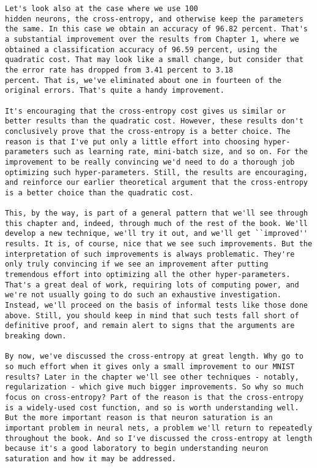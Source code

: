 \begin{lstlisting}
Let's look also at the case where we use 100
hidden neurons, the cross-entropy, and otherwise keep the parameters the same. In this case we obtain an accuracy of 96.82 percent. That's a substantial improvement over the results from Chapter 1, where we obtained a classification accuracy of 96.59 percent, using the quadratic cost. That may look like a small change, but consider that the error rate has dropped from 3.41 percent to 3.18
percent. That is, we've eliminated about one in fourteen of the original errors. That's quite a handy improvement.

It's encouraging that the cross-entropy cost gives us similar or better results than the quadratic cost. However, these results don't conclusively prove that the cross-entropy is a better choice. The reason is that I've put only a little effort into choosing hyper-parameters such as learning rate, mini-batch size, and so on. For the improvement to be really convincing we'd need to do a thorough job optimizing such hyper-parameters. Still, the results are encouraging, and reinforce our earlier theoretical argument that the cross-entropy is a better choice than the quadratic cost.

This, by the way, is part of a general pattern that we'll see through this chapter and, indeed, through much of the rest of the book. We'll develop a new technique, we'll try it out, and we'll get ``improved'' results. It is, of course, nice that we see such improvements. But the interpretation of such improvements is always problematic. They're only truly convincing if we see an improvement after putting tremendous effort into optimizing all the other hyper-parameters. That's a great deal of work, requiring lots of computing power, and we're not usually going to do such an exhaustive investigation. Instead, we'll proceed on the basis of informal tests like those done above. Still, you should keep in mind that such tests fall short of definitive proof, and remain alert to signs that the arguments are breaking down.

By now, we've discussed the cross-entropy at great length. Why go to so much effort when it gives only a small improvement to our MNIST results? Later in the chapter we'll see other techniques - notably, regularization - which give much bigger improvements. So why so much focus on cross-entropy? Part of the reason is that the cross-entropy is a widely-used cost function, and so is worth understanding well. But the more important reason is that neuron saturation is an important problem in neural nets, a problem we'll return to repeatedly throughout the book. And so I've discussed the cross-entropy at length because it's a good laboratory to begin understanding neuron saturation and how it may be addressed.


\end{lstlisting}
